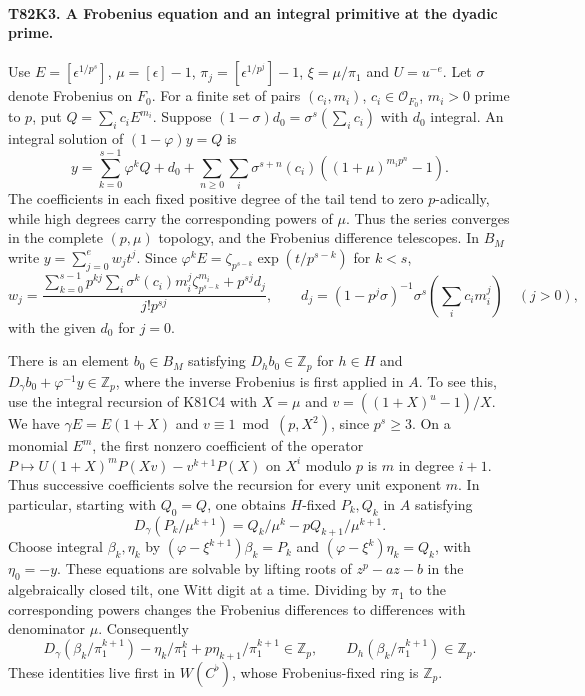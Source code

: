 \paragraph{T82K3. A Frobenius equation and an integral primitive at the dyadic prime.}
Use $E=[\epsilon^{1/p^s}]$, $\mu=[\epsilon]-1$,
$\pi_j=[\epsilon^{1/p^j}]-1$, $\xi=\mu/\pi_1$ and $U=u^{-e}$.
Let $\sigma$ denote Frobenius on $F_0$. For a finite set of pairs
$(c_i,m_i)$, $c_i\in\mathcal O_{F_0}$, $m_i>0$ prime to $p$, put
$Q=\sum_i c_i E^{m_i}$. Suppose
$(1-\sigma)d_0=\sigma^s(\sum_i c_i)$ with $d_0$ integral.
An integral solution of $(1-\varphi)y=Q$ is
\[
 y=\sum_{k=0}^{s-1}\varphi^k Q+d_0+
       \sum_{n\ge0}\sum_i\sigma^{s+n}(c_i)((1+\mu)^{m_i p^n}-1).
\]
The coefficients in each fixed positive degree of the tail tend
to zero $p$-adically, while high degrees carry the corresponding
powers of $\mu$. Thus the series converges in the complete $(p,\mu)$
topology, and the Frobenius difference telescopes. In $B_M$ write
$y=\sum_{j=0}^e w_jt^j$. Since
$\varphi^k E=\zeta_{p^{s-k}}\exp(t/p^{s-k})$ for $k<s$,
\[
 w_j=\frac{
 \sum_{k=0}^{s-1}p^{kj}\sum_i\sigma^k(c_i)m_i^j\zeta_{p^{s-k}}^{m_i}
              +p^{sj}d_j}{j!p^{sj}},
 \qquad
 d_j=(1-p^j\sigma)^{-1}\sigma^s\!\left(\sum_i c_i m_i^j\right)
 \quad(j>0),
\]
with the given $d_0$ for $j=0$.

There is an element $b_0\in B_M$ satisfying
$D_h b_0\in\mathbb Z_p$ for $h\in H$ and
$D_\gamma b_0+\varphi^{-1}y\in\mathbb Z_p$, where the inverse
Frobenius is first applied in $A$. To see this, use the integral
recursion of K81C4 with $X=\mu$ and $v=((1+X)^u-1)/X$. We have
$\gamma E=E(1+X)$ and $v\equiv1\bmod(p,X^2)$, since
$p^s\ge3$. On a monomial $E^m$, the first nonzero coefficient
of the operator
$P\mapsto U(1+X)^mP(Xv)-v^{k+1}P(X)$ on $X^i$ modulo $p$ is
$m$ in degree $i+1$. Thus successive coefficients solve the
recursion for every unit exponent $m$. In particular, starting with
$Q_0=Q$, one obtains $H$-fixed $P_k,Q_k$ in $A$ satisfying
\[
 D_\gamma(P_k/\mu^{k+1})=
        Q_k/\mu^k-p Q_{k+1}/\mu^{k+1}.
\]
Choose integral $\beta_k,\eta_k$ by
$(\varphi-\xi^{k+1})\beta_k=P_k$ and
$(\varphi-\xi^k)\eta_k=Q_k$, with $\eta_0=-y$. These equations
are solvable by lifting roots of $z^p-a z-b$ in the algebraically
closed tilt, one Witt digit at a time. Dividing by $\pi_1$ to the
corresponding powers changes the Frobenius differences to differences
with denominator $\mu$. Consequently
\[
 D_\gamma(\beta_k/\pi_1^{k+1})-\eta_k/\pi_1^k
                       +p\eta_{k+1}/\pi_1^{k+1}\in\mathbb Z_p,
 \qquad D_h(\beta_k/\pi_1^{k+1})\in\mathbb Z_p .
\]
These identities live first in $W(C^\flat)$, whose Frobenius-fixed
ring is $\mathbb Z_p$.

